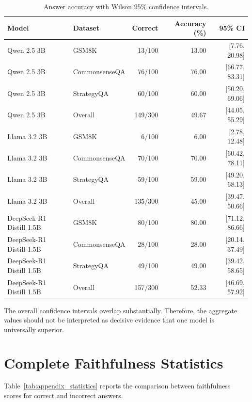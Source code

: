 \documentclass{article}
\begin{document}
\begin{table}[t]
\centering
\small
\caption{Answer accuracy with Wilson 95\% confidence intervals.}
\label{tab:appendix_accuracy}
\begin{tabular}{llrrr}
\toprule
\textbf{Model} &
\textbf{Dataset} &
\textbf{Correct} &
\textbf{Accuracy (\%)} &
\textbf{95\% CI} \\
\midrule
Qwen 2.5 3B & GSM8K & 13/100 & 13.00 & [7.76, 20.98] \\
Qwen 2.5 3B & CommonsenseQA & 76/100 & 76.00 & [66.77, 83.31] \\
Qwen 2.5 3B & StrategyQA & 60/100 & 60.00 & [50.20, 69.06] \\
Qwen 2.5 3B & Overall & 149/300 & 49.67 & [44.05, 55.29] \\
\midrule
Llama 3.2 3B & GSM8K & 6/100 & 6.00 & [2.78, 12.48] \\
Llama 3.2 3B & CommonsenseQA & 70/100 & 70.00 & [60.42, 78.11] \\
Llama 3.2 3B & StrategyQA & 59/100 & 59.00 & [49.20, 68.13] \\
Llama 3.2 3B & Overall & 135/300 & 45.00 & [39.47, 50.66] \\
\midrule
DeepSeek-R1 Distill 1.5B & GSM8K & 80/100 & 80.00 & [71.12, 86.66] \\
DeepSeek-R1 Distill 1.5B & CommonsenseQA & 28/100 & 28.00 & [20.14, 37.49] \\
DeepSeek-R1 Distill 1.5B & StrategyQA & 49/100 & 49.00 & [39.42, 58.65] \\
DeepSeek-R1 Distill 1.5B & Overall & 157/300 & 52.33 & [46.69, 57.92] \\
\bottomrule
\end{tabular}
\end{table}

The overall confidence intervals overlap substantially. Therefore, the
aggregate values should not be interpreted as decisive evidence that one model
is universally superior.

\section{Complete Faithfulness Statistics}
\label{app:statistics}

Table~\ref{tab:appendix_statistics} reports the comparison between
faithfulness scores for correct and incorrect answers.
\end{document}
